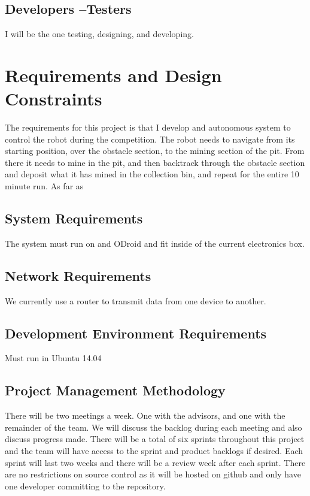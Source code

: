 \subsection{Developers --Testers}
I will be the one testing, designing, and developing.


\section{Requirements and Design Constraints}
The requirements for this project is that I develop and autonomous system to control the robot during the competition. The robot needs to navigate from its starting position, over the obstacle section, to the mining section of the pit. From there it needs to mine in the pit, and then backtrack through the obstacle section and deposit what it has mined in the collection bin, and repeat for the entire 10 minute run.  As far as 

\subsection{System  Requirements}

The system must run on and ODroid and fit inside of the current electronics box.


\subsection{Network Requirements}
We currently use a router to transmit data from one device to another.


\subsection{Development Environment Requirements}
Must run in Ubuntu 14.04


\subsection{Project  Management Methodology}
There will be two meetings a week. One with the advisors, and one with the remainder of the team. We will discuss the backlog during each meeting and also discuss progress made. There will be a total of six sprints throughout this project and the team will have access to the sprint and product backlogs if desired. Each sprint will last two weeks and there will be a review week after each sprint. There are no restrictions on source control as it will be hosted on github and only have one developer committing to the repository.

